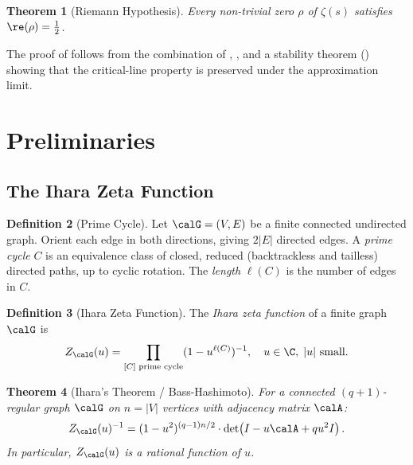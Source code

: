 \documentclass[12pt, a4paper]{article}
\theoremstyle{plain}
\newtheorem{theorem}{Theorem}[section]
\theoremstyle{definition}
\newtheorem{definition}[theorem]{Definition}
\begin{document}
\begin{theorem}[Riemann Hypothesis]\label{thm:rh}
  Every non-trivial zero $\rho$ of $\zeta(s)$ satisfies $\re(\rho) = \frac{1}{2}$.
\end{theorem}

The proof of  follows from the combination of ,
, and a stability theorem () showing that
the critical-line property is preserved under the approximation limit.

\section{Preliminaries}\label{sec:prelim}

\subsection{The Ihara Zeta Function}

\begin{definition}[Prime Cycle]\label{def:prime_cycle}
  Let $\calG = (V, E)$ be a finite connected undirected graph. Orient each
  edge in both directions, giving $2|E|$ directed edges. A \emph{prime cycle}
  $C$ is an equivalence class of closed, reduced (backtrackless and tailless)
  directed paths, up to cyclic rotation. The \emph{length} $\ell(C)$ is the
  number of edges in $C$.
\end{definition}

\begin{definition}[Ihara Zeta Function]\label{def:ihara}
  The \emph{Ihara zeta function} of a finite graph $\calG$ is
  \begin{equation}\label{eq:ihara}
    Z_\calG(u) = \prod_{[C] \text{ prime cycle}} (1 - u^{\ell(C)})^{-1},
    \quad u \in \C, \; |u| \text{ small}.
  \end{equation}
\end{definition}

\begin{theorem}[Ihara's Theorem / Bass-Hashimoto]\label{thm:ihara_formula}
  For a connected $(q+1)$-regular graph $\calG$ on $n = |V|$ vertices
  with adjacency matrix $\calA$:
  \begin{equation}\label{eq:ihara_formula}
    Z_\calG(u)^{-1} = (1 - u^2)^{(q-1)n/2} \cdot
    \det\!\left(I - u\calA + qu^2 I\right).
  \end{equation}
  In particular, $Z_\calG(u)$ is a rational function of $u$.
\end{theorem}
\end{document}
